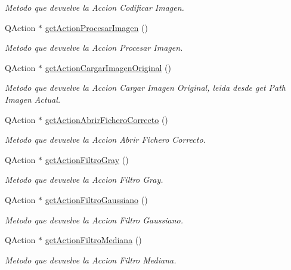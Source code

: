 \begin{DoxyCompactItemize}
\begin{DoxyCompactList}\small\item\em Metodo que devuelve la Accion Codificar Imagen. \end{DoxyCompactList}\item 
Q\+Action $\ast$ \hyperlink{classCAplicacion_aba97c29b89e7c7b1163e3e3cde189e4b}{get\+Action\+Procesar\+Imagen} ()
\begin{DoxyCompactList}\small\item\em Metodo que devuelve la Accion Procesar Imagen. \end{DoxyCompactList}\item 
Q\+Action $\ast$ \hyperlink{classCAplicacion_a00c192ecc07c4690802eb38c1f48731b}{get\+Action\+Cargar\+Imagen\+Original} ()
\begin{DoxyCompactList}\small\item\em Metodo que devuelve la Accion Cargar Imagen Original, leida desde get Path Imagen Actual. \end{DoxyCompactList}\item 
Q\+Action $\ast$ \hyperlink{classCAplicacion_a4b70b7b2987f70046fa1ea8c4ed02990}{get\+Action\+Abrir\+Fichero\+Correcto} ()
\begin{DoxyCompactList}\small\item\em Metodo que devuelve la Accion Abrir Fichero Correcto. \end{DoxyCompactList}\item 
Q\+Action $\ast$ \hyperlink{classCAplicacion_a45304c1304bedcde6c42cf3f9c7b4f19}{get\+Action\+Filtro\+Gray} ()
\begin{DoxyCompactList}\small\item\em Metodo que devuelve la Accion Filtro Gray. \end{DoxyCompactList}\item 
Q\+Action $\ast$ \hyperlink{classCAplicacion_a5929e30f259ac77d0f72a8fbd1cb89c7}{get\+Action\+Filtro\+Gaussiano} ()
\begin{DoxyCompactList}\small\item\em Metodo que devuelve la Accion Filtro Gaussiano. \end{DoxyCompactList}\item 
Q\+Action $\ast$ \hyperlink{classCAplicacion_a8439aed96fa9a5a80f37be6b2dd67f4b}{get\+Action\+Filtro\+Mediana} ()
\begin{DoxyCompactList}\small\item\em Metodo que devuelve la Accion Filtro Mediana. \end{DoxyCompactList}\item 

\end{DoxyCompactItemize}
